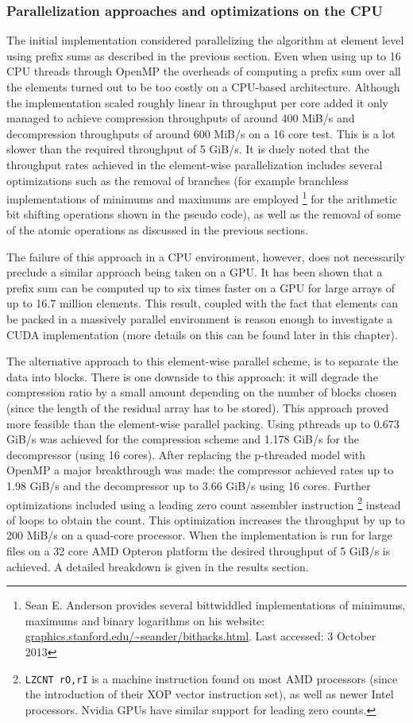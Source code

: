   \subsubsection{Parallelization approaches and optimizations on the CPU}
  The initial implementation considered parallelizing the algorithm at element level using prefix sums as described in the previous section. Even when using up to 16 CPU threads through OpenMP the overheads of computing a prefix 
  sum over all the elements turned out to be too costly on a CPU-based architecture. Although the implementation scaled roughly linear in throughput per core added it only managed to achieve compression throughputs of around 
  400 MiB/s and decompression throughputs of around 600 MiB/s on a 16 core test. This is a lot slower than the required throughput of 5 GiB/s. It is duely noted that the throughput rates achieved in the element-wise parallelization 
  includes several optimizations such as the removal of branches (for example branchless implementations of minimums and maximums are employed \footnote{Sean E. Anderson 
  provides several bittwiddled implementations of minimums, maximums and binary logarithms on his website: \url{graphics.stanford.edu/~seander/bithacks.html}. Last accessed: 3 
  October 2013} for the arithmetic bit shifting operations shown in the pseudo code), as well as the removal of some of the atomic operations as discussed in the previous sections.
  
  The failure of this approach in a CPU environment, however, does not necessarily preclude a similar approach being taken on a GPU. It has been shown \cite{harris2007parallel} that a 
  prefix sum can be computed up to six times faster on a GPU for large arrays of up to 16.7 million elements. This result, coupled with the fact that elements can be packed in a massively
  parallel environment is reason enough to investigate a CUDA implementation (more details on this can be found later in this chapter).
  
  The alternative approach to this element-wise parallel scheme, is to separate the data into blocks. There is one downside to this approach: it will degrade the compression
  ratio by a small amount depending on the number of blocks chosen (since the length of the residual array has to be stored). This approach proved more feasible than the 
  element-wise parallel packing. Using pthreads up to 0.673 GiB/s was achieved for the compression scheme and 1.178 GiB/s for the decompressor (using 16 cores). After replacing
  the p-threaded model with OpenMP a major breakthrough was made: the compressor achieved rates up to 1.98 GiB/s and the decompressor up to 3.66 GiB/s using 16 cores. Further 
  optimizations included using a leading zero count assembler instruction \footnote{\texttt{LZCNT rO,rI} is a machine instruction found on most AMD processors (since the 
  introduction of their XOP vector instruction set), as well as newer Intel processors. Nvidia GPUs have similar support for leading zero counts.} instead of loops to obtain 
  the count. This optimization increases the throughput by up to 200 MiB/s on a quad-core processor. When the implementation is run for large files on a 32 core AMD Opteron platform
  the desired throughput of 5 GiB/s is achieved. A detailed breakdown is given in the results section.
